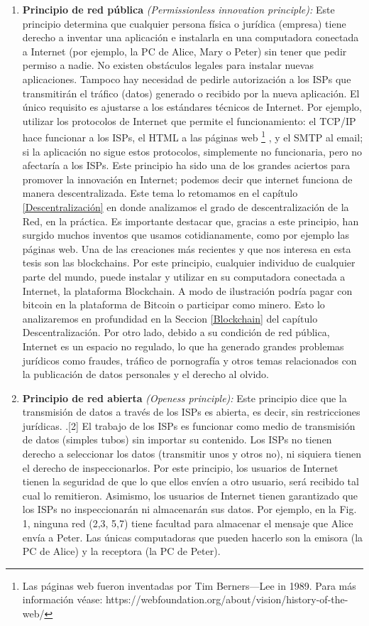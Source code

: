 \documentclass[12pt]{report} %
\begin{document}
\begin{enumerate}
\item{\textbf {Principio de red pública} \textit{(Permissionless innovation principle):}} Este principio determina que cualquier persona física o jurídica (empresa) tiene derecho a inventar una aplicación e instalarla en una computadora conectada a Internet (por ejemplo, la PC de Alice, Mary o Peter) sin tener que pedir permiso a nadie. No existen obstáculos legales para instalar nuevas aplicaciones. Tampoco hay necesidad de pedirle autorización a los ISPs que transmitirán el tráfico (datos) generado o recibido por la nueva aplicación.  El único requisito es ajustarse a los estándares técnicos de Internet. Por ejemplo, utilizar los protocolos de Internet que permite el funcionamiento: el TCP/IP hace funcionar a los ISPs, el HTML a las páginas web \footnote{Las páginas web fueron inventadas por Tim Berners—Lee in 1989. Para más información véase: https://webfoundation.org/about/vision/history-of-the-web/} , y el SMTP al email; si la aplicación no sigue estos protocolos, simplemente no funcionaria, pero no afectaría a los ISPs. Este principio ha sido una de los grandes aciertos para promover la innovación en Internet; podemos decir que internet funciona de manera descentralizada. Este tema lo retomamos en el capítulo \ref {Descentralización} en donde analizamos el grado de descentralización de la Red, en la práctica. Es importante destacar que, gracias a este principio, han surgido muchos inventos que usamos cotidianamente, como por ejemplo las páginas web. Una de las creaciones más recientes y que nos interesa en esta tesis son las blockchains. Por este principio, cualquier individuo de cualquier parte del mundo, puede instalar y utilizar en su computadora conectada a Internet, la plataforma Blockchain. A modo de ilustración podría pagar con bitcoin en la plataforma de Bitcoin o participar como minero. Esto lo analizaremos en profundidad en la Seccion \ref{Blockchain} del capítulo Descentralización. Por otro lado, debido a su condición de red pública, Internet es un espacio no regulado, lo que ha generado grandes problemas jurídicos como fraudes, tráfico de pornografía y otros temas relacionados con la publicación de datos personales y el derecho al olvido.

\item{\textbf {Principio de red abierta}\textit{ (Openess principle):}} Este principio dice que la transmisión de datos a través de los ISPs es abierta, es decir, sin restricciones jurídicas. .[2] El trabajo de los ISPs es funcionar como medio de transmisión de datos (simples tubos) sin importar su contenido. Los ISPs no tienen derecho a seleccionar los datos (transmitir unos y otros no), ni siquiera tienen el derecho de inspeccionarlos.  Por este principio, los usuarios de Internet tienen la seguridad de que lo que ellos envíen a otro usuario, será recibido tal cual lo remitieron. Asimismo, los usuarios de Internet tienen garantizado que los ISPs no inspeccionarán ni almacenarán sus datos. Por ejemplo, en la Fig. 1, ninguna red (2,3, 5,7) tiene facultad para almacenar el mensaje que Alice envía a Peter. Las únicas computadoras que pueden hacerlo son la emisora (la PC de Alice) y la receptora (la PC de Peter).

\end{enumerate}
\end{document}
